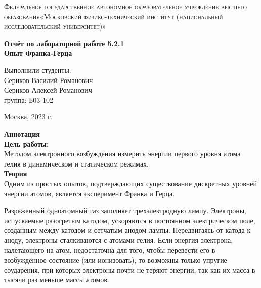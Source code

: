 \documentclass[a4paper, 12pt]{article}%
\begin{document}
	\begin{titlepage}
		\begin{center}
			\textsc{Федеральное государственное автономное образовательное учреждение высшего образования«Московский физико-технический институт (национальный исследовательский университет)»\\[5mm]
			}
			
			\vfill
			
			\textbf{Отчёт по лабораторной работе 5.2.1\\[3mm]
				Опыт Франка-Герца
				\\[50mm]
			}
			
		\end{center}
		
		\hfill
		\begin{minipage}{.5\textwidth}
			Выполнили студенты:\\[2mm]
			Сериков Василий Романович\\[2mm]
			Сериков Алексей Романович\\[2mm]
			группа: Б03-102\\[5mm]
			
		\end{minipage}
		\vfill
		\begin{center}
			Москва, 2023 г.
		\end{center}
		
	\end{titlepage}
	
	\newpage
	\setcounter{page}{2}
	\textbf{Аннотация}\\
	
	\textbf{Цель работы: }\\
Методом электронного возбуждения измерить энергии первого уровня атома гелия в динамическом и статическом режимах.\\

	\textbf{Теория}\\
Одним из простых опытов, подтверждающих существование дискретных уровней энергии атомов, является эксперимент Франка и Герца.

Разреженный одноатомный газ заполняет трехэлектродную лампу.  Электроны, испускаемые разогретым катодом, ускоряются в постоянном электрическом поле, созданным между катодом и сетчатым анодом лампы. Передвигаясь от катода к аноду, электроны сталкиваются с атомами гелия. Если энергия электрона, налетающего на атом, недостаточна для того, чтобы перевести его в возбуждённое состояние (или ионизовать), то возможны только упругие соударения, при которых электроны почти не теряют энергии, так как их масса в тысячи раз меньше массы атомов.
\end{document}
